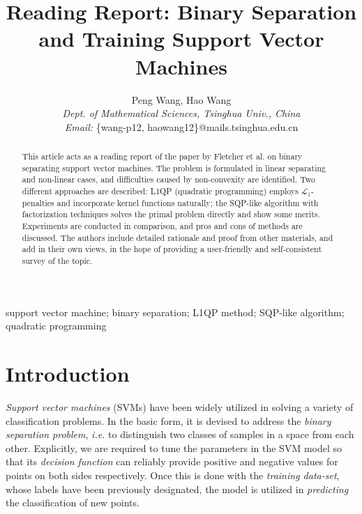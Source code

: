 \documentclass[11pt,a4paper]{article}
\theoremstyle{definition}
\newenvironment{keywords}{\small\par\noindent{\bf Keywords:}}{\par}
\begin{document}
  \title{Reading Report: Binary Separation and Training Support Vector Machines}
  \author{Peng Wang, Hao Wang\\ \textit{Dept. of Mathematical Sciences, Tsinghua Univ., China}\\ \textit{Email: }\{wang-p12, haowang12\}@mails.tsinghua.edu.cn}
  \date{}
  \maketitle
  \begin{abstract}
    This article acts as a reading report of the paper by Fletcher et al. on binary separating support vector machines. The problem is formulated in linear separating and non-linear cases, and difficulties caused by non-convexity are identified. Two different approaches are described: L1QP (quadratic programming) employs $\mathcal{L}_{1}$-penalties and incorporate kernel functions naturally; the SQP-like algorithm with factorization techniques solves the primal problem directly and show some merits. Experiments are conducted in comparison, and pros and cons of methods are discussed. The authors include detailed rationale and proof from other materials, and add in their own views, in the hope of providing a user-friendly and self-consistent survey of the topic.
  \end{abstract}
  \begin{keywords}
    support vector machine; binary separation; L1QP method; SQP-like algorithm; quadratic programming
  \end{keywords}
  \section{Introduction}
    \textit{Support vector machines} (SVMs) have been widely utilized in solving a variety of classification problems. In the basic form, it is devised to address the \textit{binary separation problem}, \textit{i.e.} to distinguish two classes of samples in a space from each other. Explicitly, we are required to tune the parameters in the SVM model so that its \textit{decision function} can reliably provide positive and negative values for points on both sides respectively. Once this is done with the \textit{training data-set}, whose labels have been previously designated, the model is utilized in \emph{predicting} the classification of new points.
\end{document}
